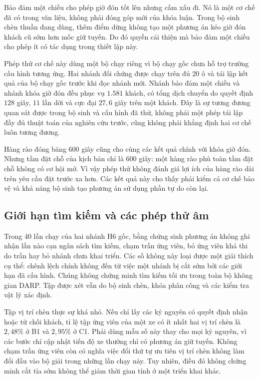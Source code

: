 Bảo đảm một chiều cho phép giờ đón tốt lên nhưng cấm xấu đi. Nó là một cơ chế đã có
trong văn liệu, không phải đóng góp mới của khóa luận. Trong bộ sinh chèn thuần đang
dùng, thêm điểm dừng không tạo một phương án kéo giờ đón khách cũ sớm hơn mốc giữ tuyến.
Do đó quyền cải thiện mà bảo đảm một chiều cho phép ít có tác dụng trong thiết lập này.

Phép thử cơ chế này dùng một bộ chạy riêng vì bộ chạy gốc chưa hỗ trợ trường cấu
hình tương ứng. Hai nhánh đối chứng được chạy trên đủ 20 ô và tái lập kết quả của
bộ chạy gốc trước khi đọc nhánh mới. Nhánh bảo đảm một chiều và nhánh khóa giờ đón
đều phục vụ $1.581$ khách, có tổng dịch chuyển do quyết định $128$ giây, $11$ lần
dời và cực đại $27{,}6$ giây trên một khách. Đây là sự tương đương quan sát được
trong bộ sinh và cấu hình đã thử, không phải một phép tái lập đầy đủ thuật toán
của nghiên cứu trước, cũng không phải khẳng định hai cơ chế luôn tương đương.

Hàng rào đóng băng 600 giây cũng cho cùng các kết quả chính với khóa giờ đón.
Nhưng tầm đặt chỗ của kịch bản chỉ là 600 giây: một hàng rào phủ toàn tầm đặt chỗ
không có cơ hội mở. Vì vậy phép thử không đánh giá lợi ích của hàng rào dài trên
yêu cầu đặt trước xa hơn. Các kết quả này cho thấy phải kiểm cả cơ chế bảo vệ và
khả năng bộ sinh tạo phương án sử dụng phần tự do còn lại.

\subsection{Giới hạn tìm kiếm và các phép thử âm}
\label{muc:bosinh}

Trong 40 lần chạy của hai nhánh H6 gốc, bằng chứng sinh phương án không ghi nhận
lần nào cạn ngân sách tìm kiếm, chạm trần ứng viên, bỏ ứng viên khả thi do trần
hay bỏ nhánh chưa khai triển. Các số không này loại được một giải thích cụ thể:
chênh lệch chính không đến từ việc một nhánh bị cắt sớm bởi các giới hạn đã cấu
hình. Chúng không chứng minh tìm kiếm tối ưu trong toàn bộ không gian DARP.
Tập được xét vẫn do bộ sinh chèn, khóa phân công và các kiểm tra vật lý xác định.

Tập vị trí chèn thực sự khá nhỏ. Nếu chỉ lấy các kỷ nguyên có quyết định nhận
hoặc từ chối khách, tỉ lệ tập ứng viên của một xe có ít nhất hai vị trí chèn là
$2{,}48\%$ ở B1 và $2{,}95\%$ ở C1. Phải dùng mẫu số này thay cho mọi kỷ nguyên,
vì các bước chỉ cập nhật tiến độ xe thường chỉ có phương án giữ tuyến. Không
chạm trần ứng viên còn có nghĩa việc đổi thứ tự ưu tiên vị trí chèn không làm
đổi đầu vào bộ giải trong những lần chạy này. Tuy nhiên, điều đó không chứng
minh cắt tỉa sớm không thể giảm thời gian tính ở một triển khai khác.

